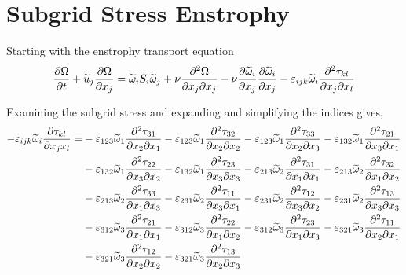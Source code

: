 \newcommand{\vort}{\widetilde{\omega}}
\newcommand{\enst}{\Omega}
\section{Subgrid Stress Enstrophy}
Starting with the enstrophy transport equation
\begin{equation}
    \pdv{\enst}{t} + \widetilde{u}_{j} \pdv{\enst}{x_{j}} =
        \vort_{i} S_{i} \vort_{j} + \nu \pdv{\enst}{x_{j}}{x_{j}} -
        \nu \pdv{\vort_{i}}{x_{j}}  \pdv{\vort_{i}}{x_{j}} -
        \varepsilon_{ijk} \vort_{i} \pdv{\tau_{kl}}{x_{j}}{x_{l}}
\end{equation}

Examining the subgrid stress and expanding and simplifying the indices
gives,
\begin{equation}
    \begin{split}
        - \varepsilon_{ijk} \vort_{i} \pdv{\tau_{kl}}{x_{j} x_{l}} = & 
                -\varepsilon_{123} \vort_{1} \pdv{\tau_{31}}{x_{2}}{x_{1}}
                -\varepsilon_{123} \vort_{1} \pdv{\tau_{32}}{x_{2}}{x_{2}}
                -\varepsilon_{123} \vort_{1} \pdv{\tau_{33}}{x_{2}}{x_{3}}
                -\varepsilon_{132} \vort_{1} \pdv{\tau_{21}}{x_{3}}{x_{1}}\\ 
            &   -\varepsilon_{132} \vort_{1} \pdv{\tau_{22}}{x_{3}}{x_{2}} 
                -\varepsilon_{132} \vort_{1} \pdv{\tau_{23}}{x_{3}}{x_{3}} 
                -\varepsilon_{213} \vort_{2} \pdv{\tau_{31}}{x_{1}}{x_{1}} 
                -\varepsilon_{213} \vort_{2} \pdv{\tau_{32}}{x_{1}}{x_{2}}\\ 
            &   -\varepsilon_{213} \vort_{2} \pdv{\tau_{33}}{x_{1}}{x_{3}} 
                -\varepsilon_{231} \vort_{2} \pdv{\tau_{11}}{x_{3}}{x_{1}}
                -\varepsilon_{231} \vort_{2} \pdv{\tau_{12}}{x_{3}}{x_{2}}
                -\varepsilon_{231} \vort_{2} \pdv{\tau_{13}}{x_{3}}{x_{3}}\\
            &   -\varepsilon_{312} \vort_{3} \pdv{\tau_{21}}{x_{1}}{x_{1}}
                -\varepsilon_{312} \vort_{3} \pdv{\tau_{22}}{x_{1}}{x_{2}}
                -\varepsilon_{312} \vort_{3} \pdv{\tau_{23}}{x_{1}}{x_{3}}
                -\varepsilon_{321} \vort_{3} \pdv{\tau_{11}}{x_{2}}{x_{1}}\\
            &   -\varepsilon_{321} \vort_{3} \pdv{\tau_{12}}{x_{2}}{x_{2}}
                -\varepsilon_{321} \vort_{3} \pdv{\tau_{13}}{x_{2}}{x_{3}}
    \end{split}
\end{equation}
